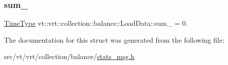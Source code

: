 \mbox{\label{structvt_1_1vrt_1_1collection_1_1balance_1_1_load_data_ab20f34a82481f573b8db44d7d2f9111c}} 
\subsubsection{\texorpdfstring{sum\+\_\+}{sum\_}}
{\footnotesize\ttfamily \hyperlink{namespacevt_a876a9d0cd5a952859c72de8a46881442}{Time\+Type} vt\+::vrt\+::collection\+::balance\+::\+Load\+Data\+::sum\+\_\+ = 0.}



The documentation for this struct was generated from the following file\+:\begin{DoxyCompactItemize}
\item 
src/vt/vrt/collection/balance/\hyperlink{stats__msg_8h}{stats\+\_\+msg.\+h}\end{DoxyCompactItemize}
